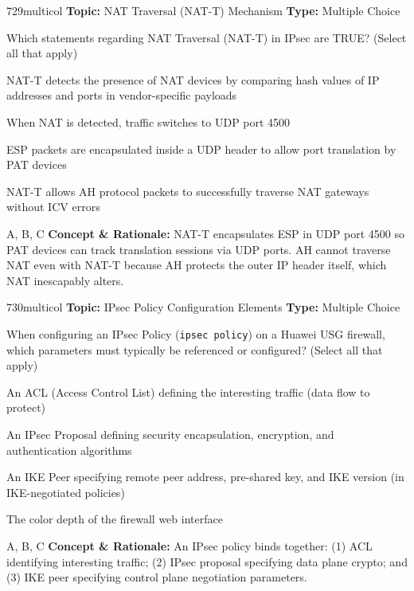 \begin{qcard}{729}{multicol}
\textcolor{darkslate!75}{\small\textbf{Topic:} NAT Traversal (NAT-T) Mechanism \hfill \textbf{Type:} Multiple Choice}\vspace{0.4em}\par
Which statements regarding NAT Traversal (NAT-T) in IPsec are TRUE? (Select all that apply)
\begin{qoptions}
\item NAT-T detects the presence of NAT devices by comparing hash values of IP addresses and ports in vendor-specific payloads
\item When NAT is detected, traffic switches to UDP port 4500
\item ESP packets are encapsulated inside a UDP header to allow port translation by PAT devices
\item NAT-T allows AH protocol packets to successfully traverse NAT gateways without ICV errors
\end{qoptions}
\end{qcard}
\nopagebreak
\begin{explainbox}{A, B, C}
\textbf{Concept \& Rationale:} NAT-T encapsulates ESP in UDP port 4500 so PAT devices can track translation sessions via UDP ports. AH cannot traverse NAT even with NAT-T because AH protects the outer IP header itself, which NAT inescapably alters.
\end{explainbox}

\begin{qcard}{730}{multicol}
\textcolor{darkslate!75}{\small\textbf{Topic:} IPsec Policy Configuration Elements \hfill \textbf{Type:} Multiple Choice}\vspace{0.4em}\par
When configuring an IPsec Policy (\texttt{ipsec policy}) on a Huawei USG firewall, which parameters must typically be referenced or configured? (Select all that apply)
\begin{qoptions}
\item An ACL (Access Control List) defining the interesting traffic (data flow to protect)
\item An IPsec Proposal defining security encapsulation, encryption, and authentication algorithms
\item An IKE Peer specifying remote peer address, pre-shared key, and IKE version (in IKE-negotiated policies)
\item The color depth of the firewall web interface
\end{qoptions}
\end{qcard}
\nopagebreak
\begin{explainbox}{A, B, C}
\textbf{Concept \& Rationale:} An IPsec policy binds together: (1) ACL identifying interesting traffic; (2) IPsec proposal specifying data plane crypto; and (3) IKE peer specifying control plane negotiation parameters.
\end{explainbox}

